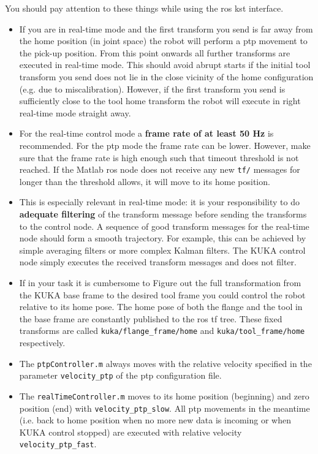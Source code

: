 \documentclass[headsepline,footinclude=false,fontsize=11pt,paper=a4,listof=totoc,bibliography=totoc,BCOR=12mm,DIV=14]{scrbook}
\begin{document}
\newpage
You should pay attention to these things while using the \gls{ros} \gls{kst} interface.

\begin{itemize}
	\item If you are in real-time mode and the first transform you send is far away from the home position (in joint space) the robot will perform a \gls{ptp} movement to the pick-up position. From this point onwards all further transforms are executed in real-time mode. This should avoid abrupt starts if the initial tool transform you send does not lie in the close vicinity of the home configuration (e.g. due to miscalibration). However, if the first transform you send is sufficiently close to the tool home transform the robot will execute in right real-time mode straight away.
	\item For the real-time control mode a \textbf{frame rate of at least 50 Hz} is recommended. For the \gls{ptp} mode the frame rate can be lower. However, make sure that the frame rate is high enough such that timeout threshold is not reached. If the Matlab \gls{ros} node does not receive any new \texttt{tf/} messages for longer than the threshold allows, it will move to its home position.
	\item This is especially relevant in real-time mode: it is your responsibility to do \textbf{adequate filtering} of the transform message before sending the transforms to the control node. A sequence of good transform messages for the real-time node should form a smooth trajectory. For example, this can be achieved by simple averaging filters or more complex Kalman filters. The KUKA control node simply executes the received transform messages and does not filter.
	\item If in your task it is cumbersome to Figure out the full transformation from the KUKA base frame to the desired tool frame you could control the robot relative to its home pose. The home pose of both the flange and the tool in the base frame are constantly published to the \gls{ros} tf tree. These fixed transforms are called \texttt{kuka/flange\_frame/home} and \texttt{kuka/tool\_frame/home} respectively.
	\item The \texttt{ptpController.m} always moves with the relative velocity specified in the parameter \texttt{velocity\_ptp} of the \gls{ptp} configuration file. 
	\item The \texttt{realTimeController.m} moves to its home position (beginning) and zero position (end) with \texttt{velocity\_ptp\_slow}. All \gls{ptp} movements in the meantime (i.e. back to home position when no more new data is incoming or when KUKA control stopped) are executed with relative velocity \texttt{velocity\_ptp\_fast}.

\end{itemize}
\end{document}
